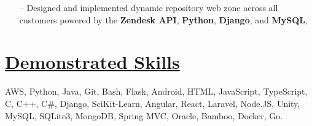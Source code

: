 \documentclass{article}
\begin{document}
\begin{multicols}{2}
{{\begin{itemize}
	\item[--] Designed and implemented dynamic repository web zone across all customers powered by the \textbf{Zendesk API}, \textbf{Python}, \textbf{Django}, and \textbf{MySQL}, 
\end{itemize}
}}
\section*{\underline{Demonstrated Skills}}
{\footnotesize{
AWS, Python, Java, Git, Bash, Flask, Android, HTML, JavaScript, TypeScript, C, C++, C\#, Django, SciKit-Learn, Angular, React, Laravel, Node.JS, Unity, MySQL, SQLite3, MongoDB, Spring MVC, Oracle, Bamboo, Docker, Go.
}}
\hfill
\hfill \break

\end{multicols}
\end{document}
